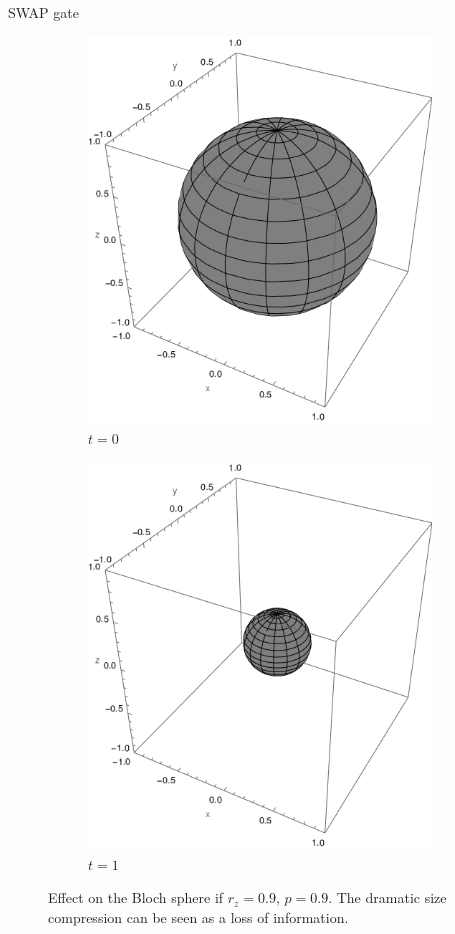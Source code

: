 \begin{frame}{SWAP gate}
    \begin{figure}[h!]
        \centering
        \begin{subfigure}{0.475\textwidth}
          \centering
          \includegraphics[width=0.6\linewidth]{../notes/log/maxent/figures/sphere_swapcontraction_t=0_z=0.9_p=0.9.png}
          \caption{$t=0$}
        \end{subfigure}%
        \begin{subfigure}{0.475\textwidth}
          \centering
          \includegraphics[width=0.6\linewidth]{../notes/log/maxent/figures/sphere_swapcontraction_t=1_z=0.9_p=0.9.png}
          \caption{$t=1$}
        \end{subfigure}
        \caption{Effect on the Bloch sphere if $r_{z}=0.9$, $p=0.9$. The dramatic size compression can be seen as a loss of information.}
        \label{fig:SWAPFactorSequence}
    \end{figure}
\end{frame}

